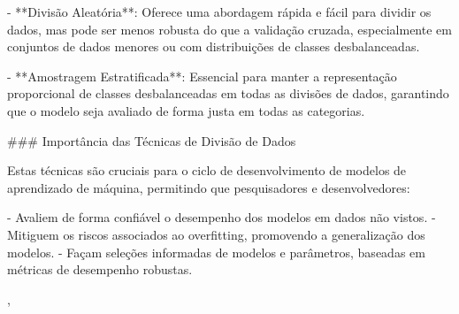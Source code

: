 {- **Divisão Aleatória**: Oferece uma abordagem rápida e fácil para dividir os dados, mas pode ser menos robusta do que a validação cruzada, especialmente em conjuntos de dados menores ou com distribuições de classes desbalanceadas.

- **Amostragem Estratificada**: Essencial para manter a representação proporcional de classes desbalanceadas em todas as divisões de dados, garantindo que o modelo seja avaliado de forma justa em todas as categorias.

### Importância das Técnicas de Divisão de Dados

Estas técnicas são cruciais para o ciclo de desenvolvimento de modelos de aprendizado de máquina, permitindo que pesquisadores e desenvolvedores:

- Avaliem de forma confiável o desempenho dos modelos em dados não vistos.
- Mitiguem os riscos associados ao overfitting, promovendo a generalização dos modelos.
- Façam seleções informadas de modelos e parâmetros, baseadas em métricas de desempenho robustas.

},
